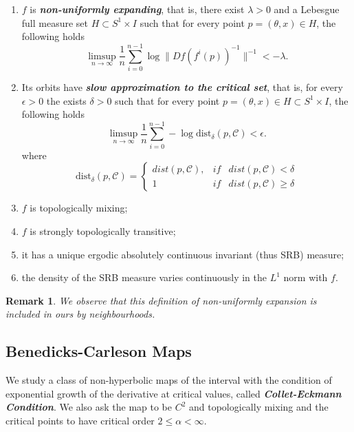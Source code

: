 \documentclass[12pt,a4paper]{amsart}
\theoremstyle{plain}
\newtheorem{remark}{Remark}[subsection]
\begin{document}
\begin{enumerate}
	\item[(1)] $f$ is \textbf{\textit{non-uniformly expanding}}, that is, there exist $\lambda > 0$ and a Lebesgue full measure set $H \subset S^{1} \times I$ such that 
	for every point $p=(\theta, x) \in H$, the following holds
	\[
	\displaystyle \limsup_{n \to \infty} \frac{1}{n} \sum_{i=0}^{n-1} \log \parallel Df(f^{i}(p))^{-1}\parallel^{-1} < -\lambda.
	\]  
	\item[(2)] Its orbits have \textbf{\textit{slow approximation to the critical set}}, that is, for every $\epsilon > 0$ the exists $\delta > 0$ such that for every point
	$p=(\theta, x) \in H \subset S^{1} \times I$, the following holds 
	\[
	\displaystyle \limsup_{n \to \infty} \frac{1}{n} \sum_{i=0}^{n-1} - \log \text{dist}_{\delta}(p,\mathcal{C}) < \epsilon.
	\]  
	where 
	\[
	\text{dist}_{\delta}(p,\mathcal{C}) =  
	\left\{ 
	\begin{array}{ccc}
		dist(p,\mathcal{C}), & if & dist(p,\mathcal{C}) < \delta\\
		1 & if & dist(p,\mathcal{C}) \geq \delta 
	\end{array}
	\right.
	\]  
	\item[(3)] $f$ is topologically mixing;
	
	\item[(4)] $f$ is strongly topologically transitive;
	
	\item[(5)] it has a unique ergodic absolutely continuous invariant (thus SRB) measure;
	
	\item[(6)]the density of the SRB measure varies continuously in the $L^{1}$ norm with $f$.
\end{enumerate}

\begin{remark}
	We observe that this definition of non-uniformly expansion is included in ours by neighbourhoods.
\end{remark}

\subsection{Benedicks-Carleson Maps} We study a class of non-hyperbolic maps of the interval with the condition of exponential growth of the derivative at critical values, called 
\textbf{\textit{Collet-Eckmann Condition}}. We also ask the map to be $C^{2}$ and topologically mixing and the critical points to have critical order 
$2 \leq \alpha < \infty$.
\end{document}
